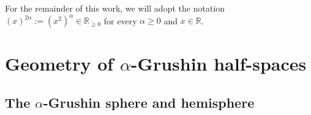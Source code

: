 \documentclass[11pt,twoside,a4paper]{article}
\newcommand{\blue}{\color{blue}}
\newcommand{\R}{\mathbb{R}}
\theoremstyle{theorem}
\theoremstyle{definition}
\theoremstyle{remark}
\newtheorem{remark}[theorem]{Remark}
\theoremstyle{proof}
\begin{document}

For the remainder of this work, we will adopt the notation $(x)^{2 \alpha} := (x^2)^\alpha  \in \R_{\geq 0}$ for every $\alpha \geq 0$ and $x\in\R$.

\section{Geometry of \texorpdfstring{$\alpha$}{alpha}-Grushin half-spaces}
\label{section:themodels}

\subsection{The \texorpdfstring{$\alpha$}{alpha}-Grushin sphere and hemisphere}
\label{section:alphaGrushin}
\end{document}
